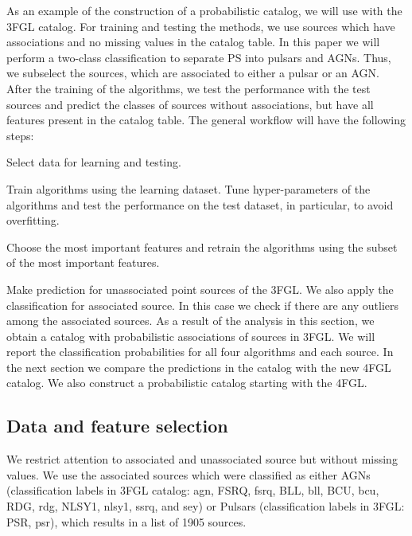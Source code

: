 As an example of the construction of a probabilistic catalog, we will use with the 3FGL catalog.
For training and testing the methods, we use sources which have associations and no missing values in the catalog table.
In this paper we will perform a two-class classification to separate PS into pulsars and AGNs.
Thus, we subselect the sources, which are associated to either a pulsar or an AGN.
After the training of the algorithms, we test the performance with the test sources and predict the classes of sources without associations,
but have all features present in the catalog table.
The general workflow will have the following steps:
\ben
\item
Select data for learning and testing.
\item
Train algorithms using the learning dataset.
Tune hyper-parameters of the algorithms and test the performance on the test dataset, in particular, to avoid overfitting.
\item
Choose the most important features and
retrain the algorithms using the subset of the most important features.
\item
Make prediction for unassociated point sources of the 3FGL.
We also apply the classification for associated source. In this case we check if there are any outliers among the associated sources.
\een
As a result of the analysis in this section, we obtain a catalog with probabilistic associations of sources in 3FGL.
We will report the classification probabilities for all four algorithms and each source.
In the next section we compare the predictions in the catalog with the new 4FGL catalog.
We also construct a probabilistic catalog starting with the 4FGL.


\subsection{Data and feature selection}

We restrict attention to associated and unassociated source but without missing values. 
We use the associated sources which were classified as either AGNs (classification labels in 3FGL catalog: agn, FSRQ, fsrq, BLL, bll, BCU, bcu, RDG, rdg, NLSY1, nlsy1, ssrq, and sey) or Pulsars (classification labels in 3FGL: PSR, psr), which results in a list of 1905 sources. 

